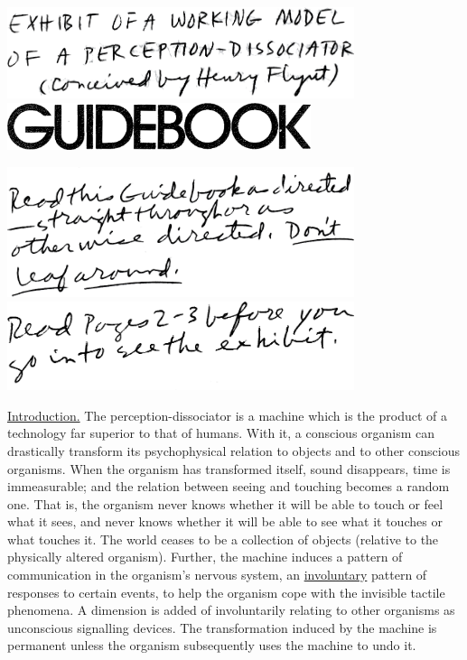 {
	\centering

\includegraphics[width=4in]{img/guidebook_01}
\vfill
\includegraphics[width=3.5in]{img/guidebook}

\vfill
\includegraphics[width=4in]{img/guidebook_02}
\vfill
\includegraphics[width=4in]{img/guidebook_03}
\vfill

}

\clearpage
{}

\uline{Introduction.} The perception-dissociator is a machine which is the 
product of a technology far superior to that of humans. With it, a conscious 
organism can drastically transform its psychophysical relation to objects and 
to other conscious organisms. When the organism has transformed itself, 
sound disappears, time is immeasurable; and the relation between seeing and 
touching becomes a random one. That is, the organism never knows whether 
it will be able to touch or feel what it sees, and never knows whether it will 
be able to see what it touches or what touches it. The world ceases to be a 
collection of objects (relative to the physically altered organism). Further, 
the machine induces a pattern of communication in the organism's nervous 
system, an \uline{involuntary} pattern of responses to certain events, to help the 
organism cope with the invisible tactile phenomena. A dimension is added of 
involuntarily relating to other organisms as unconscious signalling devices. 
The transformation induced by the machine is permanent unless the 
organism subsequently uses the machine to undo it. 


